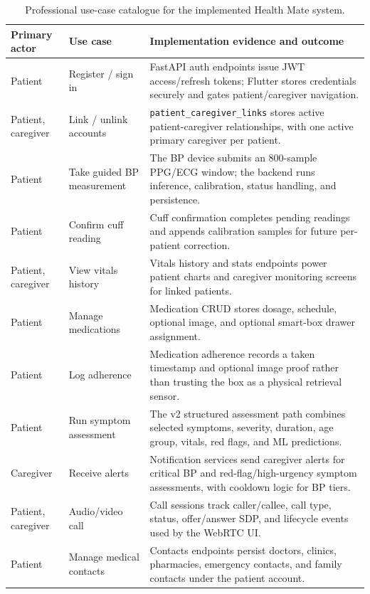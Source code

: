 \documentclass[12pt,a4paper]{report}
\begin{document}
\begin{table}[H]
\centering
\caption{Professional use-case catalogue for the implemented Health Mate system.}
\label{tab:usecases}
\small
\begin{tabularx}{\linewidth}{@{}>{\raggedright\arraybackslash}p{2.9cm}>{\raggedright\arraybackslash}p{3.8cm}Y@{}}
\toprule
\textbf{Primary actor} & \textbf{Use case} & \textbf{Implementation evidence and outcome} \\
\midrule
Patient & Register / sign in & FastAPI auth endpoints issue JWT access/refresh tokens; Flutter stores credentials securely and gates patient/caregiver navigation. \\
Patient, caregiver & Link / unlink accounts & \texttt{patient\_caregiver\_links} stores active patient-caregiver relationships, with one active primary caregiver per patient. \\
Patient & Take guided BP measurement & The BP device submits an 800-sample PPG/ECG window; the backend runs inference, calibration, status handling, and persistence. \\
Patient & Confirm cuff reading & Cuff confirmation completes pending readings and appends calibration samples for future per-patient correction. \\
Patient, caregiver & View vitals history & Vitals history and stats endpoints power patient charts and caregiver monitoring screens for linked patients. \\
Patient & Manage medications & Medication CRUD stores dosage, schedule, optional image, and optional smart-box drawer assignment. \\
Patient & Log adherence & Medication adherence records a taken timestamp and optional image proof rather than trusting the box as a physical retrieval sensor. \\
Patient & Run symptom assessment & The v2 structured assessment path combines selected symptoms, severity, duration, age group, vitals, red flags, and ML predictions. \\
Caregiver & Receive alerts & Notification services send caregiver alerts for critical BP and red-flag/high-urgency symptom assessments, with cooldown logic for BP tiers. \\
Patient, caregiver & Audio/video call & Call sessions track caller/callee, call type, status, offer/answer SDP, and lifecycle events used by the WebRTC UI. \\
Patient & Manage medical contacts & Contacts endpoints persist doctors, clinics, pharmacies, emergency contacts, and family contacts under the patient account. \\
\bottomrule
\end{tabularx}
\end{table}
\end{document}
